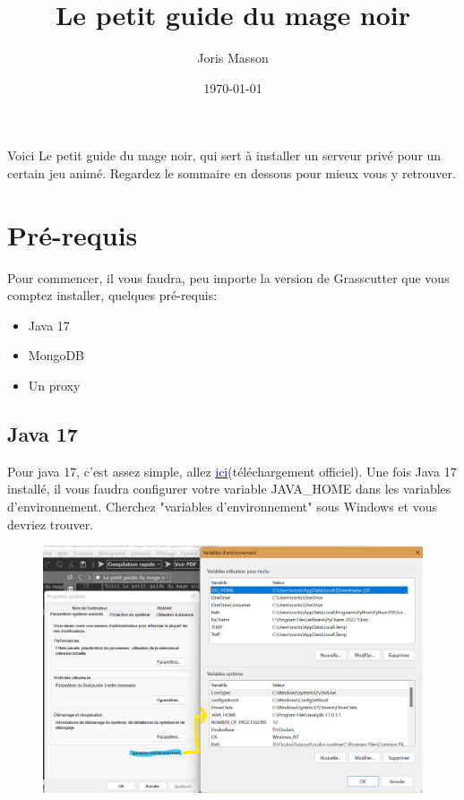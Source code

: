 \documentclass{article}
\title{Le petit guide du mage noir}
\author{Joris Masson}
\date{\today}
\begin{document}
\maketitle
Voici Le petit guide du mage noir, qui sert à installer un serveur privé pour un certain jeu animé. Regardez le sommaire en dessous pour mieux vous y retrouver.
\newpage
\tableofcontents

\newpage

\section{Pré-requis}
Pour commencer, il vous faudra, peu importe la version de Grasscutter que vous comptez installer, quelques pré-requis:
\begin{itemize}
	\item Java 17
	\item MongoDB
	\item Un proxy
\end{itemize}

\subsection{Java 17}
Pour java 17, c'est assez simple, allez \href{https://download.oracle.com/java/17/archive/jdk-17.0.3.1_windows-x64_bin.exe}{\textcolor{blue}{ici}}(téléchargement officiel).\newline
Une fois Java 17 installé, il vous faudra configurer votre variable JAVA\_HOME dans les variables d'environnement. Cherchez "variables d'environnement" sous Windows et vous devriez trouver.

\begin{figure}[!h]
\includegraphics[scale=0.5]{img/env_var.png}
\end{figure}
\end{document}

